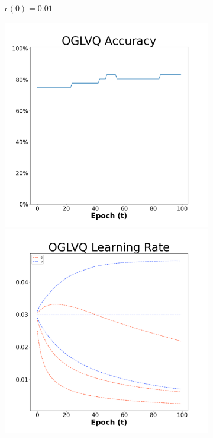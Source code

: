 \begin{figure}[H]
\begin{subfigure}{0.3\textwidth}
  \caption{$\epsilon(0)=0.01$}
\end{subfigure}\hfil %
\begin{subfigure}{0.3\textwidth}
  \includegraphics[width=\linewidth]{images/exper1/Ionosphere/OGLVQ_0.03_acc.png}
  \includegraphics[width=\linewidth]{images/exper1/Ionosphere/OGLVQ_0.03_lr.png}

\end{subfigure}
\end{figure}
